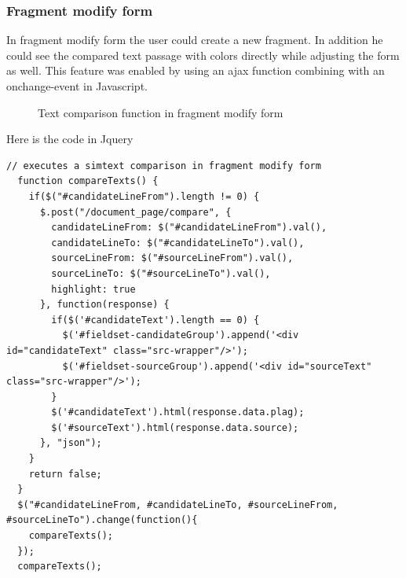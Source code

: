 \subsubsection{Fragment modify form}

In fragment modify form the user could create a new fragment. In addition he could see the compared text passage with colors directly while adjusting the form as well. This feature was enabled by using an ajax function combining with an onchange-event in Javascript.

\begin{figure}[!h]
  \centering
  \caption{Text comparison function in fragment modify form}
  \label{fig:report_deckblatt}
\end{figure}

Here is the code in Jquery

\begin{lstlisting}[caption=Cropping an image to a square aspect ratio]
// executes a simtext comparison in fragment modify form
  function compareTexts() {
    if($("#candidateLineFrom").length != 0) {
      $.post("/document_page/compare", {
        candidateLineFrom: $("#candidateLineFrom").val(),
        candidateLineTo: $("#candidateLineTo").val(),
        sourceLineFrom: $("#sourceLineFrom").val(),
        sourceLineTo: $("#sourceLineTo").val(),
        highlight: true
      }, function(response) {
        if($('#candidateText').length == 0) {
          $('#fieldset-candidateGroup').append('<div id="candidateText" class="src-wrapper"/>');
          $('#fieldset-sourceGroup').append('<div id="sourceText" class="src-wrapper"/>');
        }
        $('#candidateText').html(response.data.plag);
        $('#sourceText').html(response.data.source);
      }, "json");
    }
    return false;
  }
  $("#candidateLineFrom, #candidateLineTo, #sourceLineFrom, #sourceLineTo").change(function(){
    compareTexts();
  });
  compareTexts();
\end{lstlisting}